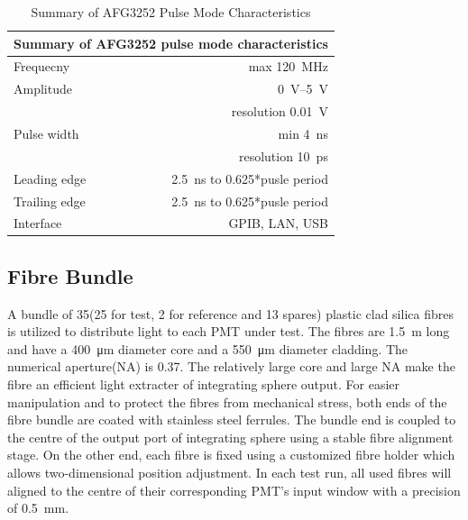 \documentclass[5p, times]{elsarticle}
\begin{document}
\begin{table}[h!]
\caption{Summary of AFG3252 Pulse Mode Characteristics}
\label{tab:afg3252}
 \begin{center}
 \begin{tabular}{lr}
 \multicolumn{2}{l}{Summary of AFG3252 pulse mode characteristics}\\ \hline
 Frequecny & max \SI{120}{\MHz} \\
 Amplitude & \SIrange{0}{5}{\volt} \\
           & resolution \SI{0.01}{\volt} \\
 Pulse width & min \SI{4}{\nano\second} \\
             & resolution \SI{10}{\pico\second} \\
 Leading edge & \SI{2.5}{\nano\second} to 0.625*pusle period \\
 Trailing edge & \SI{2.5}{\nano\second} to 0.625*pusle period \\
 Interface     & GPIB, LAN, USB
 \end{tabular}
 \end{center}
\end{table} 

\subsection{Fibre Bundle}
\label{sec:fibre_bundle}

A bundle of 35(25 for test, 2 for reference and 13 spares) plastic clad silica fibres is utilized to distribute light to each PMT under test.
The fibres are \SI{1.5}{\meter} long and have a \SI{400}{\micro\meter} diameter core and a \SI{550}{\micro\meter} diameter cladding.
The numerical aperture(NA) is 0.37.
The relatively large core and large NA make the fibre an efficient light extracter of integrating sphere output. 
For easier manipulation and to protect the fibres from mechanical stress, both ends of the fibre bundle are coated with stainless steel ferrules.
The bundle end is coupled to the centre of the output port of integrating sphere using a stable fibre alignment stage.
On the other end, each fibre is fixed using a customized fibre holder which allows two-dimensional position adjustment.
In each test run, all used fibres will aligned to the centre of their corresponding PMT's input window with a precision of \SI{0.5}{\milli\meter}.  
\end{document}
